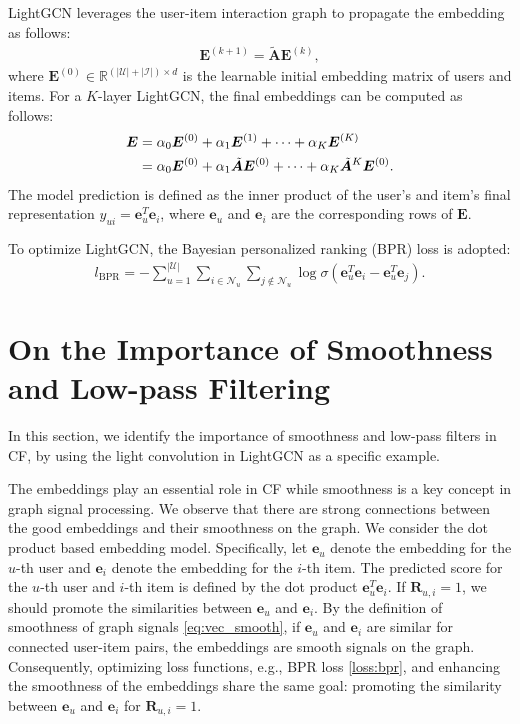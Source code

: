 \documentclass[sigconf]{acmart}
\begin{document}
LightGCN leverages the user-item interaction graph to propagate the embedding as follows:
\begin{align*}
    \bm{E}^{(k+1)} = \tilde{\bm{A}}\bm{E}^{(k)},
\end{align*}
where $\bm{E}^{(0)} \in \mathbb{R}^{(|\mathcal{U}|+|\mathcal{I}|) \times d}$ is the learnable initial embedding matrix of users and items. For a $K$-layer LightGCN, the final embeddings can be computed as follows:
\begin{align} \label{LGCN:final}
    \bm{E} &= \alpha_0 \bm{E}^{(0)} + \alpha_1 \bm{E}^{(1)} + \cdots + \alpha_K \bm{E}^{(K)} \notag\\
    &= \alpha_0 \bm{E}^{(0)} +  \alpha_1 \tilde{\bm{A}}\bm{E}^{(0)} + \cdots + \alpha_K \tilde{\bm{A}}^{K}\bm{E}^{(0)}.
\end{align}
The model prediction is defined as the inner product of the user's and item's final representation $y_{ui} = \bm{e}_u^T \bm{e}_i$, where $\bm{e}_u$ and $\bm{e}_i$ are the corresponding rows of $\bm{E}$.

To optimize LightGCN, the Bayesian personalized ranking (BPR) loss \cite{rendle2012bpr} is adopted:
\begin{align} \label{loss:bpr}
    l_{\text{BPR}} = - \sum_{u = 1}^{|\mathcal{U}|} \sum_{i \in \mathcal{N}_u} \sum_{j \notin \mathcal{N}_u } \log \sigma(\bm{e}_u^T \bm{e}_i -  \bm{e}_u^T \bm{e}_j).
\end{align}


\section{On the Importance of Smoothness and Low-pass Filtering}\label{sec:smooth}
In this section, we identify the importance of smoothness and low-pass filters in CF, by using the light convolution in LightGCN as a specific example.


The embeddings play an essential role in CF while smoothness is a key concept in graph signal processing. We observe that there are strong connections between the good embeddings and their smoothness on the graph. We consider the dot product based embedding model. Specifically, let $\bm{e}_u$ denote the embedding for the $u$-th user and $\bm{e}_i$ denote the embedding for the $i$-th item. The predicted score for the $u$-th user and $i$-th item is defined by the dot product $\bm{e}_u^T \bm{e}_i$. If $\bm{R}_{u,i} = 1$, we should promote the similarities between $\bm{e}_u$ and $\bm{e}_i$. By the definition of smoothness of graph signals \eqref{eq:vec_smooth}, if $\bm{e}_u$ and $\bm{e}_i$ are similar for connected user-item pairs, the embeddings are smooth signals on the graph. Consequently, optimizing loss functions, e.g., BPR loss \eqref{loss:bpr}, and enhancing the smoothness of the embeddings share the same goal: promoting the similarity between $\bm{e}_u$ and $\bm{e}_i$ for $\bm{R}_{u,i} = 1$. 
\end{document}
